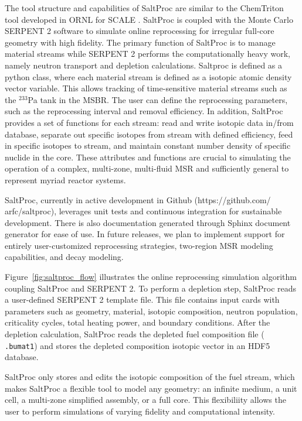 The tool structure and capabilities of SaltProc are similar to the ChemTriton tool 
developed in \gls{ORNL} for SCALE \cite{powers_new_2013}. SaltProc is coupled 
with the Monte Carlo SERPENT 2
software to simulate online reprocessing for irregular full-core 
geometry with high fidelity.  The primary function of SaltProc is to 
manage material streams while
SERPENT 2 performs the computationally heavy work, namely neutron 
transport and depletion
calculations. Saltproc is defined as a python class, where each material stream 
is defined as a isotopic atomic density
vector variable. This allows tracking of time-sensitive material streams such 
as the
$^{233}$Pa tank in the \gls{MSBR}. The user can define the reprocessing 
parameters, such as the reprocessing interval and removal efficiency.  In 
addition, SaltProc provides a set of functions for each stream: read and write 
isotopic data in/from database, separate out specific isotopes from stream with 
defined efficiency, feed in specific isotopes to stream, and maintain constant 
number density of specific nuclide in the core. These attributes and functions 
are crucial to simulating the operation of a complex, multi-zone, multi-fluid 
\gls{MSR} and sufficiently general to represent myriad reactor systems.

SaltProc, currently in active development in Github (https://github.com/ 
arfc/saltproc), leverages unit tests and continuous integration for 
sustainable development. There is also documentation
generated through Sphinx document generator for ease of use. In future 
releases, we plan to 
implement
support for entirely user-customized reprocessing strategies, two-region \gls{MSR} modeling 
capabilities,
and decay modeling.

Figure~\ref{fig:saltproc_flow} illustrates the  online reprocessing simulation 
algorithm coupling SaltProc and SERPENT 2. To perform a depletion step, 
SaltProc reads a user-defined SERPENT 2 template file. This file contains input 
cards with parameters such as geometry, material, isotopic composition, neutron 
population, criticality cycles, total heating power, and boundary conditions.  
After the depletion calculation, SaltProc reads the depleted fuel composition 
file (\texttt{ .bumat1}) and stores the depleted composition isotopic vector in 
an HDF5 database. 

SaltProc only stores and edits the isotopic composition of 
the fuel stream, which makes SaltProc a flexible tool to model any geometry: an 
infinite medium, a unit cell, a multi-zone simplified assembly, or a full core.
This flexibiliity allows the user to perform simulations of varying fidelity 
and computational intensity.

